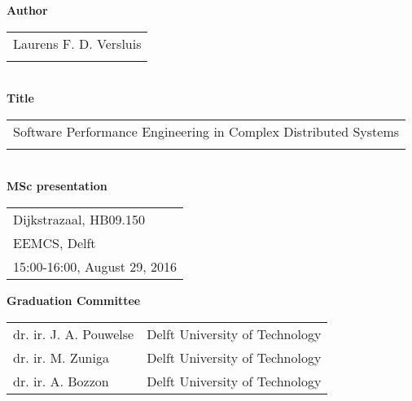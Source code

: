\thispagestyle{empty}

\noindent \textbf{Author}\\
\begin{tabular}{l}
Laurens F. D. Versluis\\
\\
\end{tabular}\\
\noindent \textbf{Title}\\
\begin{tabular}{l}
Software Performance Engineering in Complex Distributed Systems\\
\\
\end{tabular}\\
\noindent \textbf{MSc presentation}\\
\begin{tabular}{l}
Dijkstrazaal, HB09.150\\
EEMCS, Delft\\
15:00-16:00, August 29, 2016
\\
\end{tabular}

\vspace{1.1cm}

\noindent \textbf{Graduation Committee}\\
\begin{tabular}{ll}
dr. ir. J. A. Pouwelse            & Delft University of Technology \\
dr. ir. M. Zuniga                 & Delft University of Technology \\
dr. ir. A. Bozzon                 & Delft University of Technology \\

\end{tabular}




